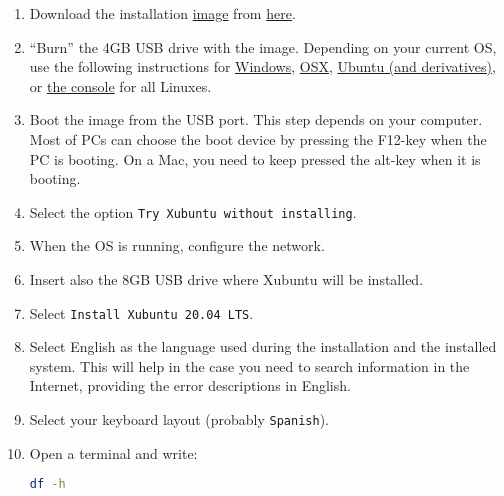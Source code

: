\begin{enumerate}
  \item Download the
    installation \href{https://en.wikipedia.org/wiki/Disk_image}{image}
    from \href{https://xubuntu.org/download/}{here}.
    
  \item ``Burn'' the 4GB USB drive with the image. Depending on your
    current OS, use the following instructions
    for \href{https://ubuntu.com/tutorials/create-a-usb-stick-on-windows#1-overview}{Windows}, \href{https://ubuntu.com/tutorials/create-a-usb-stick-on-macos#1-overview}{OSX}, \href{https://ubuntu.com/tutorials/create-a-usb-stick-on-ubuntu#1-overview}{Ubuntu
    (and derivatives)},
    or \href{https://askubuntu.com/questions/372607/how-to-create-a-bootable-ubuntu-usb-flash-drive-from-terminal}{the
    console} for all Linuxes.

\item Boot the image from the USB port. This step depends on your
  computer. Most of PCs can choose the boot device by pressing the
  F12-key when the PC is booting. On a Mac, you need to keep pressed
  the alt-key when it is booting.
  
\item Select the option \texttt{Try Xubuntu without installing}.
  
\item When the OS is running, configure the network.
  
\item Insert also the 8GB USB drive where Xubuntu will be installed.
  
\item Select \texttt{Install Xubuntu 20.04 LTS}.
  
\item Select English as the language used during the installation and the
  installed system. This will help in the case you need to search
  information in the Internet, providing the error descriptions in
  English.
  
\item Select your keyboard layout (probably \texttt{Spanish}).

\item Open a terminal and write:

  \begin{lstlisting}[language=bash]
    df -h
  \end{lstlisting}


\end{enumerate}

